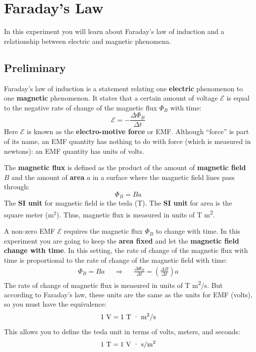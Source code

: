 \setcounter{chapter}{3}
\chapter{Faraday's Law}
%
In this experiment you will learn about Faraday's law of induction and a relationship between electric and magnetic phenomena.
%
\section{Preliminary}
%
Faraday's law of induction is a statement relating one \textbf{electric} phenomenon to one \textbf{magnetic} phenomenon. It states that a certain amount of voltage $\mathcal{E}$ is equal to the negative rate of change of the magnetic flux $\Phi_{B}$ with time:
\begin{equation}
	\mathcal{E} = -\frac{\Delta \Phi_{B}}{\Delta t}
	\label{eq.04.faradays.law}
\end{equation}
Here $\mathcal{E}$ is known as the \textbf{electro-motive force} or EMF. Although ``force'' is part of its name, an EMF quantity has nothing to do with force (which is measured in newtons): an EMF quantity has units of volts.

The \textbf{magnetic flux} is defined as the product of the amount of \textbf{magnetic field} $B$ and the amount of \textbf{area} $a$ in a surface where the magnetic field lines pass through:
\begin{equation}
	\Phi_{B} = B a
\end{equation}
The \textbf{SI unit} for magnetic field is the tesla (T). The \textbf{SI unit} for area is the square meter (m$^{2}$). Thus, magnetic flux is measured in units of T{ }\textperiodcentered{ }m\textsuperscript{2}.

A non-zero EMF $\mathcal{E}$ requires the magnetic flux $\Phi_{B}$ to change with time. In this experiment you are going to keep the \textbf{area fixed} and let the \textbf{magnetic field change with time}. In this setting, the rate of change of the magnetic flux with time is proportional to the rate of change of the magnetic field with time:
\begin{align}
	\Phi_{B} = B a && \Longrightarrow && \frac{\Delta \Phi_{B}}{\Delta t} = \left(\frac{\Delta B}{\Delta t}\right) a
	\label{eq.04.flux.rate}
\end{align}
The rate of change of magnetic flux is measured in units of T{ }\textperiodcentered{ }m\textsuperscript{2}/s. But according to Faraday's law, these units are the same as the units for EMF (volts), so you must have the equivalence:
\begin{equation}
	1 \ \text{V} = 1 \ \text{T{ }\textperiodcentered{ }m\textsuperscript{2}/s}
\end{equation}
This allows you to define the tesla unit in terms of volts, meters, and seconds:
\begin{equation}
	1 \ \text{T} = 1 \ \text{V{ }\textperiodcentered{ }s/m\textsuperscript{2}}
\end{equation}

